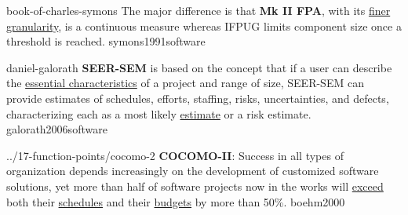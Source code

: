 \documentclass{article}
\begin{document}
\qte
  {book-of-charles-symons}
  {The major difference is that \textbf{Mk II FPA}, with its \ul{finer granularity}, is a continuous measure whereas IFPUG limits component size once a threshold is reached.}
  {symons1991software}


\qte
  {daniel-galorath}
  {\textbf{SEER-SEM} is based on the concept that if a user can describe the \ul{essential characteristics} of a project and range of size, SEER-SEM can provide estimates of schedules, efforts, staffing, risks, uncertainties, and defects, characterizing each as a most likely \ul{estimate} or a risk estimate.}
  {galorath2006software}


\qte
  {../17-function-points/cocomo-2}
  {\textbf{COCOMO-II}: Success in all types of organization depends increasingly on the development of customized software solutions, yet more than half of software projects now in the works will \ul{exceed} both their \ul{schedules} and their \ul{budgets} by more than 50\%.}
  {boehm2000}
\end{document}
